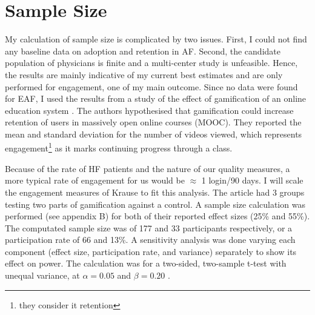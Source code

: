 \section{Sample Size}
My calculation of sample size is complicated by two issues. First, I could not find any baseline data on adoption and retention in \gls{AF}. Second, the candidate population of physicians is finite and a multi-center study is unfeasible. Hence, the results are mainly indicative of my current best estimates and are only performed for engagement, one of my main outcome. Since no data were found for \gls{EAF}, I used the results from a study of the effect of gamification of an online education system  \cite{krause2015playful}. The authors hypothesised that gamification could increase retention of users in massively open online courses (MOOC). They reported the mean and standard deviation for the number of videos viewed, which represents engagement\footnote{they consider it retention} as it marks continuing progress through a class.

Because of the rate of HF patients and the nature of our quality measures, a more typical rate of engagement for us would be $\approx$ 1 login/90 days. I will scale the engagement measures of Krause to fit this analysis. The article had 3 groups testing two parts of gamification against a control. A sample size calculation was performed (see appendix B) for both of their reported effect sizes (25\% and 55\%). The computated sample size was of 177 and 33 participants respectively, or a participation rate of 66 and 13\%. A sensitivity analysis was done varying each component (effect size, participation rate, and variance) separately to show its effect on power. The calculation was for a two-sided, two-sample t-test with unequal variance, at $\alpha = 0.05$ and $\beta = 0.20$ \cite{lachin1981introduction}.

